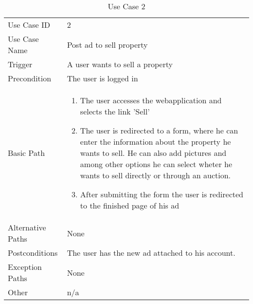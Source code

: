 \begin{table}[H]
\centering
\label{table-use-case-2}
\begin{tabular}{|p{3cm}|p{10cm}}
Use Case ID       & 2                                                         \\
Use Case Name     & Post ad to sell property                                \\
Trigger           & A user wants to sell a property					\\
Precondition      & The user is logged in\\
Basic Path        & \begin{enumerate}
\item The user accesses the webapplication and selects the link 'Sell'
\item The user is redirected to a form, where he can enter the information
about the property he wants to sell. He can also add pictures and among other
options he can select wheter he wants to sell directly or through an auction. 
\item After submitting the form the user is redirected to the finished page of
his ad
\end{enumerate} 
     \\
Alternative Paths & None                          \\
Postconditions    & The user has the new ad attached to his account.                                                          
\\
Exception Paths   & None            \\
Other             & n/a                                                                                                                                                                                                        
\end{tabular}
\caption{Use Case 2}
\end{table}

